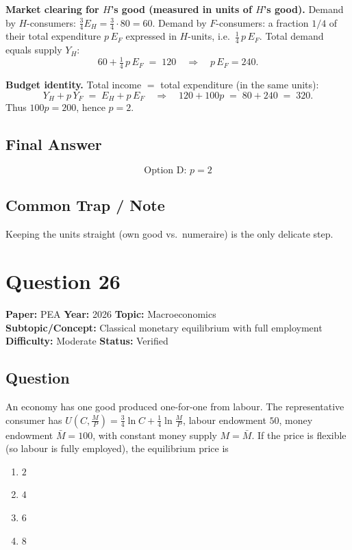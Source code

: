 \documentclass[11pt]{article}
\begin{document}
\textbf{Market clearing for $H$'s good (measured in units of $H$'s good).}
Demand by $H$-consumers: $\tfrac{3}{4} E_H = \tfrac{3}{4}\cdot 80 = 60$.
Demand by $F$-consumers: a fraction $1/4$ of their total expenditure $p\,E_F$
expressed in $H$-units, i.e.\ $\tfrac{1}{4}\,p\,E_F$.
Total demand equals supply $Y_H$:
\[
60 + \tfrac{1}{4}\,p\,E_F \;=\; 120 \quad\Longrightarrow\quad p\,E_F = 240.
\]

\textbf{Budget identity.} Total income $=$ total expenditure (in the same units):
\[
Y_H + p\,Y_F \;=\; E_H + p\,E_F \quad\Longrightarrow\quad
120 + 100 p \;=\; 80 + 240 \;=\; 320.
\]
Thus $100 p = 200$, hence $p = 2$.

\subsection*{Final Answer}
\[
\boxed{\text{Option D: } p = 2}
\]

\subsection*{Common Trap / Note}
Keeping the units straight (own good vs.\ numeraire) is the only delicate step.

\section*{Question 26}
\textbf{Paper:} PEA \quad \textbf{Year:} 2026 \quad \textbf{Topic:} Macroeconomics \\
\textbf{Subtopic/Concept:} Classical monetary equilibrium with full employment \quad
\textbf{Difficulty:} Moderate \quad \textbf{Status:} Verified

\subsection*{Question}
An economy has one good produced one-for-one from labour. The representative
consumer has $U\!\left(C, \tfrac{M}{P}\right) = \tfrac{3}{4}\ln C + \tfrac{1}{4}\ln\!\tfrac{M}{P}$,
labour endowment $50$, money endowment $\bar M = 100$, with constant money
supply $M = \bar M$. If the price is flexible (so labour is fully employed), the
equilibrium price is
\begin{enumerate}[label=(\Alph*)]
\item $2$ \item $4$ \item $6$ \item $8$
\end{enumerate}
\end{document}
